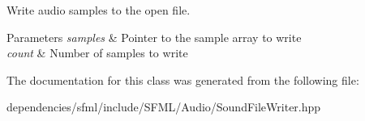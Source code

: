 Write audio samples to the open file. 


\begin{DoxyParams}{Parameters}
{\em samples} & Pointer to the sample array to write \\
\hline
{\em count} & Number of samples to write \\
\hline
\end{DoxyParams}


The documentation for this class was generated from the following file\+:\begin{DoxyCompactItemize}
\item 
dependencies/sfml/include/\+S\+F\+M\+L/\+Audio/Sound\+File\+Writer.\+hpp\end{DoxyCompactItemize}
